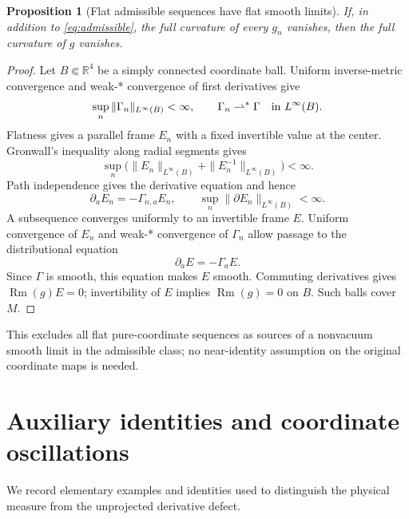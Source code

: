 \documentclass[11pt,a4paper]{article}
\numberwithin{equation}{section}
\newcommand{\R}{\mathbb R}
\newtheorem{proposition}[theorem]{Proposition}
\theoremstyle{definition}
\begin{document}
\begin{proposition}[Flat admissible sequences have flat smooth limits]\label{prop:flat-rigidity}
If, in addition to \eqref{eq:admissible}, the full curvature of every $g_n$ vanishes, then the full curvature of $g$ vanishes.
\end{proposition}
\begin{proof}
Let $B\Subset\R^4$ be a simply connected coordinate ball.
Uniform inverse-metric convergence and weak-* convergence of first
derivatives give
\begin{equation*}
\sup_n\|\Gamma_n\|_{L^\infty(B)}<\infty,\qquad
\Gamma_n\rightharpoonup^*\Gamma\quad\hbox{in }L^\infty(B).
\end{equation*}
Flatness gives a parallel frame $E_n$ with a fixed invertible value
at the center. Gronwall's inequality along radial segments gives
\begin{equation*}
\sup_n\bigl(\|E_n\|_{L^\infty(B)}
             +\|E_n^{-1}\|_{L^\infty(B)}\bigr)<\infty.
\end{equation*}
Path independence gives the derivative equation and hence
\begin{equation*}
\partial_aE_n=-\Gamma_{n,a}E_n,\qquad
\sup_n\|\partial E_n\|_{L^\infty(B)}<\infty.
\end{equation*}
A subsequence converges uniformly to an invertible frame $E$.
Uniform convergence of $E_n$ and weak-* convergence of $\Gamma_n$
allow passage to the distributional equation
\begin{equation*}
\partial_aE=-\Gamma_aE.
\end{equation*}
Since $\Gamma$ is smooth, this equation makes $E$ smooth.
Commuting derivatives gives $\operatorname{Rm}(g)E=0$; invertibility
of $E$ implies $\operatorname{Rm}(g)=0$ on $B$. Such balls cover $M$.
\end{proof}

This excludes all flat pure-coordinate sequences as sources of a nonvacuum smooth limit in the admissible class; no near-identity assumption on the original coordinate maps is needed.

\section{Auxiliary identities and coordinate oscillations}

We record elementary examples and identities used to distinguish the
physical measure from the unprojected derivative defect.
\end{document}
